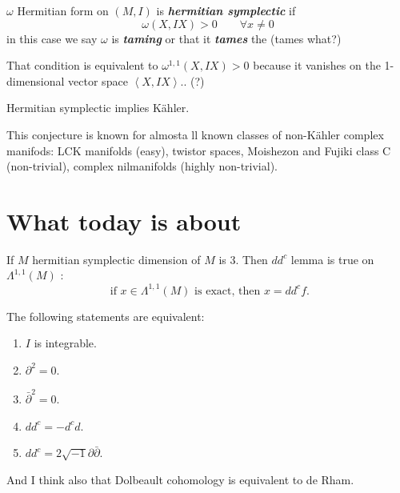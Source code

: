 \begin{defn}
	$\omega$ Hermitian form on $(M,I)$ is \textit{\textbf{hermitian symplectic}} if 
	\[\omega(X,IX)>0\qquad \forall x\neq 0\]
	in this case we say  $\omega$ is \textit{\textbf{taming}} or that it \textit{\textbf{tames}} the (tames what?)
\end{defn}

\begin{remark}
	That condition is equivalent to $\omega^{1,1}(X,IX)>0$ because it vanishes on the 1-dimensional vector space $\left<X,IX\right> $.. (?)
\end{remark}

\begin{conjecture}
	Hermitian symplectic implies K\"ahler.
\end{conjecture}

\begin{remark}
	This conjecture is known for almosta ll known classes of non-K\"ahler complex manifods: LCK manifolds (easy), twistor spaces, Moishezon and Fujiki class C (non-trivial), complex nilmanifolds (highly non-trivial).
\end{remark}

\section{What today is about}

\begin{thm}\leavevmode
	If $M$ hermitian symplectic dimension of $M$ is 3. Then $dd^c$ lemma is true on $\Lambda^{1,1}(M)$ :
	\[\text{ if } x\in\Lambda^{1,1}(M)\text{ is exact, then }x=dd^cf.  \]
\end{thm}

\begin{thm}
	The following statements are equivalent:
	\begin{enumerate}
		\item $I$ is integrable.
		\item $\partial^2=0$.
		\item $\bar\partial^2 =0$.
		\item $dd^c=-d^c d $.
		\item $dd^c=2\sqrt{-1}\partial \bar\partial$.
	\end{enumerate}
\end{thm}

\begin{remark}
	And I think also that Dolbeault cohomology is equivalent to de Rham.
\end{remark}

